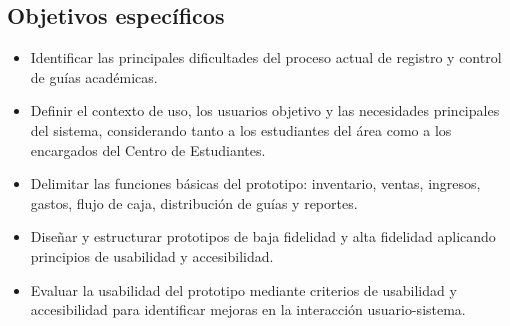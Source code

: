 \documentclass[12pt,letterpaper]{article}
\begin{document}
\subsection{Objetivos específicos}

\begin{itemize}
    \item Identificar las principales dificultades del proceso actual de registro y control de guías académicas.
    \item Definir el contexto de uso, los usuarios objetivo y las necesidades principales del sistema, considerando tanto a los estudiantes del área como a los encargados del Centro de Estudiantes.
    \item Delimitar las funciones básicas del prototipo: inventario, ventas, ingresos, gastos, flujo de caja, distribución de guías y reportes.
    \item Diseñar y estructurar prototipos de baja fidelidad y alta fidelidad aplicando principios de usabilidad y accesibilidad.
    \item Evaluar la usabilidad del prototipo mediante criterios de usabilidad y accesibilidad para identificar mejoras en la interacción usuario-sistema.
\end{itemize}
\end{document}

